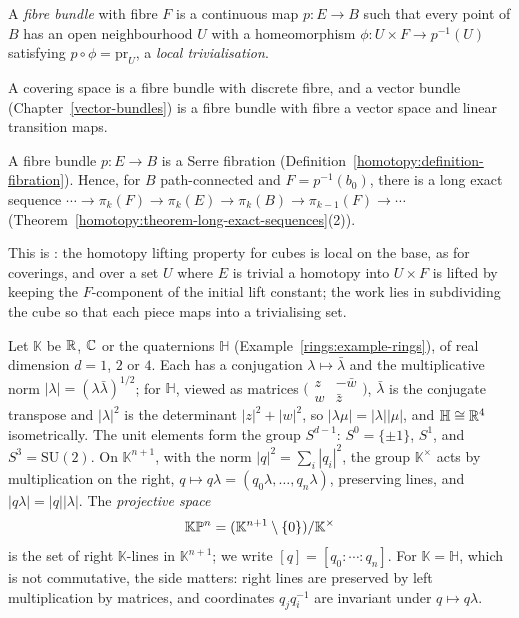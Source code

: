 \begin{definition}\label{topological-manifolds:definition-fibre-bundle}
A \emph{fibre bundle} with fibre $F$ is a continuous map $p \colon E \to B$ such that every point of $B$ has an open neighbourhood $U$ with a homeomorphism $\phi \colon U \times F \to p^{-1}(U)$ satisfying
$p \circ \phi = \mathrm{pr}_U$, a \emph{local trivialisation}.
\end{definition}

A covering space is a fibre bundle with discrete fibre, and a vector bundle (Chapter~\ref{vector-bundles}) is a fibre bundle with fibre a vector space and linear transition maps.

\begin{theorem}\label{topological-manifolds:theorem-bundles-fibrations}
A fibre bundle $p \colon E \to B$ is a Serre fibration (Definition~\ref{homotopy:definition-fibration}). Hence, for $B$ path-connected and $F = p^{-1}(b_0)$, there is a long exact sequence
$\cdots \to \pi_k(F) \to \pi_k(E) \to \pi_k(B) \to \pi_{k-1}(F) \to \cdots$ (Theorem~\ref{homotopy:theorem-long-exact-sequences}(2)).
\end{theorem}

This is \cite[Proposition 4.48]{hatcher-at}: the homotopy lifting property for cubes is local on the base, as for coverings, and over a set $U$ where $E$ is trivial a homotopy into $U \times F$ is lifted by
keeping the $F$-component of the initial lift constant; the work lies in subdividing the cube so that each piece maps into a trivialising set.

Let $\mathbb{K}$ be $\mathbb{R}$, $\mathbb{C}$ or the quaternions $\mathbb{H}$ (Example~\ref{rings:example-rings}), of real dimension $d = 1$, $2$ or $4$. Each has a conjugation $\lambda \mapsto \bar\lambda$ and the multiplicative norm
$|\lambda| = (\lambda\bar\lambda)^{1/2}$; for $\mathbb{H}$, viewed as matrices $\bigl(\begin{smallmatrix} z & -\bar w\\ w & \bar z\end{smallmatrix}\bigr)$, $\bar\lambda$ is the conjugate transpose and $|\lambda|^2$ is the determinant $|z|^2 + |w|^2$, so
$|\lambda\mu| = |\lambda||\mu|$, and $\mathbb{H} \cong \mathbb{R}^4$ isometrically. The unit elements form the group $S^{d-1}$: $S^0 = \{\pm1\}$, $S^1$, and $S^3 = \mathrm{SU}(2)$. On $\mathbb{K}^{n+1}$, with the norm
$|q|^2 = \sum_i|q_i|^2$, the group $\mathbb{K}^\times$ acts by multiplication on the right, $q \mapsto q\lambda = (q_0\lambda, \ldots, q_n\lambda)$, preserving lines, and $|q\lambda| = |q||\lambda|$. The \emph{projective space}
\[
\mathbb{K}\mathbb{P}^n = (\mathbb{K}^{n+1} \setminus \{0\})/\mathbb{K}^\times
\]
is the set of right $\mathbb{K}$-lines in $\mathbb{K}^{n+1}$; we write $[q] = [q_0 : \cdots : q_n]$. For $\mathbb{K} = \mathbb{H}$, which is not commutative, the side matters: right lines are preserved by left
multiplication by matrices, and coordinates $q_jq_i^{-1}$ are invariant under $q \mapsto q\lambda$.


